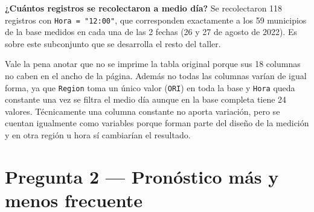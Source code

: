 \documentclass[oneside, openany, fontset=libertinus]{mitthesis}
\newenvironment{Shaded}{\begin{snugshade}}{\end{snugshade}}
\newcommand{\AttributeTok}[1]{\textcolor[rgb]{0.40,0.45,0.13}{#1}}
\newcommand{\ConstantTok}[1]{\textcolor[rgb]{0.56,0.35,0.01}{#1}}
\newcommand{\DecValTok}[1]{\textcolor[rgb]{0.68,0.00,0.00}{#1}}
\newcommand{\FunctionTok}[1]{\textcolor[rgb]{0.28,0.35,0.67}{#1}}
\newcommand{\NormalTok}[1]{\textcolor[rgb]{0.00,0.23,0.31}{#1}}
\newcommand{\OtherTok}[1]{\textcolor[rgb]{0.00,0.23,0.31}{#1}}
\newcommand{\SpecialCharTok}[1]{\textcolor[rgb]{0.37,0.37,0.37}{#1}}
\newcommand{\StringTok}[1]{\textcolor[rgb]{0.13,0.47,0.30}{#1}}
\begin{document}
\textbf{¿Cuántos registros se recolectaron a medio día?} Se recolectaron
118 registros con \texttt{Hora\ =\ "12:00"}, que corresponden
exactamente a los 59 municipios de la base medidos en cada una de las 2
fechas (26 y 27 de agosto de 2022). Es sobre este subconjunto que se
desarrolla el resto del taller.

Vale la pena anotar que no se imprime la tabla original porque sus 18
columnas no caben en el ancho de la página. Además no todas las columnas
varían de igual forma, ya que \texttt{Region} toma un único valor
(\texttt{ORI}) en toda la base y \texttt{Hora} queda constante una vez
se filtra el medio día aunque en la base completa tiene 24 valores.
Técnicamente una columna constante no aporta variación, pero se cuentan
igualmente como variables porque forman parte del diseño de la medición
y en otra región u hora sí cambiarían el resultado.

\section{Pregunta 2 --- Pronóstico más y menos frecuente}\label{p2}

\begin{Shaded}
\end{Shaded}
\end{document}
